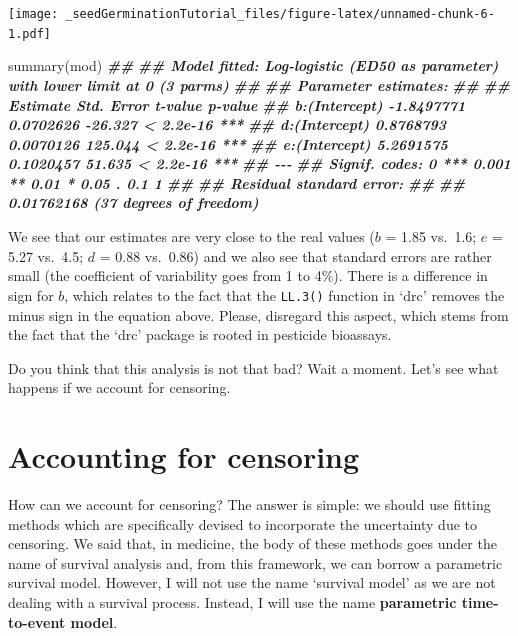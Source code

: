 \documentclass[
]{book}
\newenvironment{Shaded}{\begin{snugshade}}{\end{snugshade}}
\newcommand{\DocumentationTok}[1]{\textcolor[rgb]{0.56,0.35,0.01}{\textbf{\textit{#1}}}}
\newcommand{\FunctionTok}[1]{\textcolor[rgb]{0.00,0.00,0.00}{#1}}
\newcommand{\NormalTok}[1]{#1}
\begin{document}
\texttt{[image: \_seedGerminationTutorial\_files/figure-latex/unnamed-chunk-6-1.pdf]}

\begin{Shaded}
\begin{Highlighting}[]
\FunctionTok{summary}\NormalTok{(mod)}
\DocumentationTok{\#\# }
\DocumentationTok{\#\# Model fitted: Log{-}logistic (ED50 as parameter) with lower limit at 0 (3 parms)}
\DocumentationTok{\#\# }
\DocumentationTok{\#\# Parameter estimates:}
\DocumentationTok{\#\# }
\DocumentationTok{\#\#                 Estimate Std. Error t{-}value   p{-}value    }
\DocumentationTok{\#\# b:(Intercept) {-}1.8497771  0.0702626 {-}26.327 \textless{} 2.2e{-}16 ***}
\DocumentationTok{\#\# d:(Intercept)  0.8768793  0.0070126 125.044 \textless{} 2.2e{-}16 ***}
\DocumentationTok{\#\# e:(Intercept)  5.2691575  0.1020457  51.635 \textless{} 2.2e{-}16 ***}
\DocumentationTok{\#\# {-}{-}{-}}
\DocumentationTok{\#\# Signif. codes:  0 \textquotesingle{}***\textquotesingle{} 0.001 \textquotesingle{}**\textquotesingle{} 0.01 \textquotesingle{}*\textquotesingle{} 0.05 \textquotesingle{}.\textquotesingle{} 0.1 \textquotesingle{} \textquotesingle{} 1}
\DocumentationTok{\#\# }
\DocumentationTok{\#\# Residual standard error:}
\DocumentationTok{\#\# }
\DocumentationTok{\#\#  0.01762168 (37 degrees of freedom)}
\end{Highlighting}
\end{Shaded}

We see that our estimates are very close to the real values (\(b\) = 1.85 vs.~1.6; \(e\) = 5.27 vs.~4.5; \(d\) = 0.88 vs.~0.86) and we also see that standard errors are rather small (the coefficient of variability goes from 1 to 4\%). There is a difference in sign for \(b\), which relates to the fact that the \texttt{LL.3()} function in `drc' removes the minus sign in the equation above. Please, disregard this aspect, which stems from the fact that the `drc' package is rooted in pesticide bioassays.

Do you think that this analysis is not that bad? Wait a moment. Let's see what happens if we account for censoring.

\hypertarget{accounting-for-censoring}{%
\section{Accounting for censoring}\label{accounting-for-censoring}}

How can we account for censoring? The answer is simple: we should use fitting methods which are specifically devised to incorporate the uncertainty due to censoring. We said that, in medicine, the body of these methods goes under the name of survival analysis and, from this framework, we can borrow a parametric survival model. However, I will not use the name `survival model' as we are not dealing with a survival process. Instead, I will use the name \textbf{parametric time-to-event model}.
\end{document}
